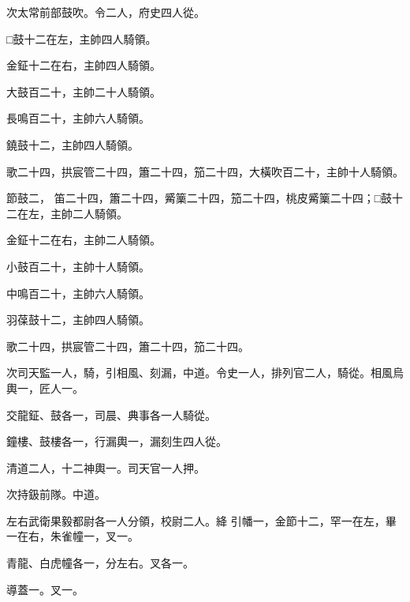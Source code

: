 \begin{pinyinscope}
 次太常前部鼓吹。令二人，府史四人從。



 □鼓十二在左，主帥四人騎領。



 金鉦十二在右，主帥四人騎領。



 大鼓百二十，主帥二十人騎領。



 長鳴百二十，主帥六人騎領。



 鐃鼓十二，主帥四人騎領。



 歌二十四，拱宸管二十四，簫二十四，笳二十四，大橫吹百二十，主帥十人騎領。



 節鼓二，
 笛二十四，簫二十四，觱篥二十四，笳二十四，桃皮觱篥二十四；□鼓十二在左，主帥二人騎領。



 金鉦十二在右，主帥二人騎領。



 小鼓百二十，主帥十人騎領。



 中鳴百二十，主帥六人騎領。



 羽葆鼓十二，主帥四人騎領。



 歌二十四，拱宸管二十四，簫二十四，笳二十四。



 次司天監一人，騎，引相風、刻漏，中道。令史一人，排列官二人，騎從。相風烏輿一，匠人一。



 交龍鉦、鼓各一，司晨、典事各一人騎從。



 鐘樓、鼓樓各一，行漏輿一，漏刻生四人從。



 清道二人，十二神輿一。司天官一人押。



 次持鈒前隊。中道。



 左右武衛果毅都尉各一人分領，校尉二人。絳
 引幡一，金節十二，罕一在左，畢一在右，朱雀幢一，叉一。



 青龍、白虎幢各一，分左右。叉各一。



 導蓋一。叉一。




\end{pinyinscope}
